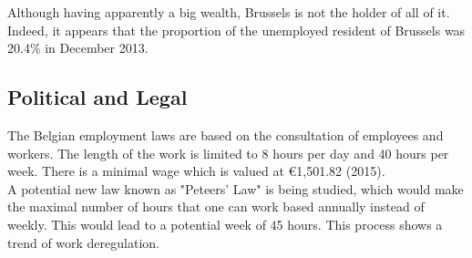 \documentclass[12pt,a4paper,oneside]{book}
\begin{document}
Although having apparently a big wealth, Brussels is not the holder of all of it. Indeed, it appears that the proportion of the unemployed resident of Brussels was 20.4\% in December 2013.\cite{unemploybx}

\subsection{Political and Legal}




The Belgian employment laws are based on the consultation of employees and workers. The length of the work is limited to 8 hours per day and 40 hours per week. There is a minimal wage which is valued at \euro 1,501.82 (2015).\cite{eurostatmw}\\

A potential new law known as "Peteers' Law" is being studied, which would make the maximal number of hours that one can work based annually instead of weekly. This would lead to a potential week of 45 hours.\cite{rtlp} This process shows a trend of work deregulation.\\

\end{document}
